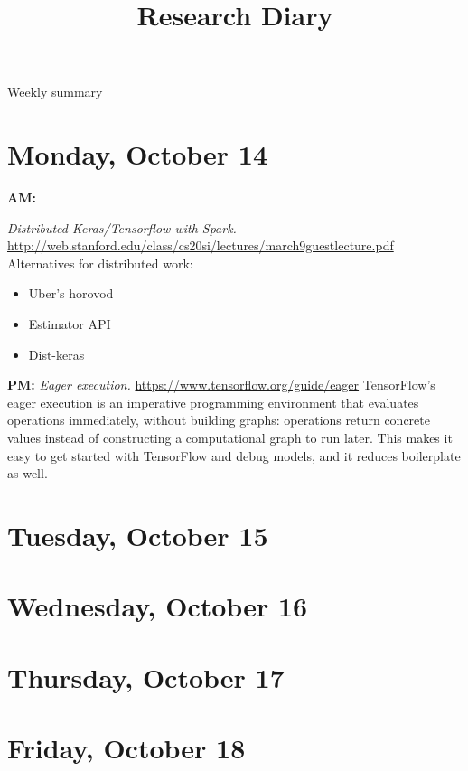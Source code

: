 \documentclass[11pt,letterpaper]{article}
\begin{document}
\univlogo

\title{Research Diary}

{\Huge Weekly summary}\\[5mm]

\section*{Monday, October 14}
\textbf{AM:}

\textit{Distributed Keras/Tensorflow with Spark. } \newline
\url{http://web.stanford.edu/class/cs20si/lectures/march9guestlecture.pdf} \newline
Alternatives for distributed work:
\begin{itemize}
\item Uber's horovod
\item Estimator API
\item Dist-keras
\end{itemize}

\textbf{PM:}
\textit{Eager execution.}
\url{https://www.tensorflow.org/guide/eager} \newline
TensorFlow's eager execution is an imperative programming environment that evaluates operations immediately, without building graphs: operations return concrete values instead of constructing a computational graph to run later. This makes it easy to get started with TensorFlow and debug models, and it reduces boilerplate as well.




\section*{Tuesday, October 15}


\section*{Wednesday, October 16}


\section*{Thursday, October 17}
 

\section*{Friday, October 18}


\printbibliography
\end{document}
